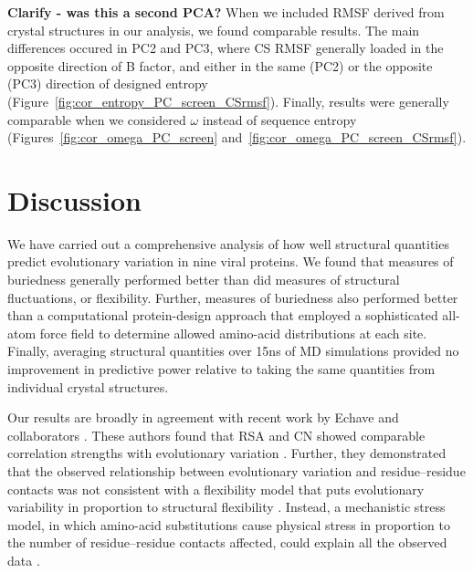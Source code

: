 \documentclass[smallextended]{svjour3}
\begin{document}
\textbf{Clarify - was this a second PCA?}
When we included RMSF derived from crystal structures in our analysis, we found comparable results. The main differences occured in PC2 and PC3, where CS RMSF generally loaded in the opposite direction of B factor, and either in the same (PC2) or the opposite (PC3) direction of designed entropy (Figure~\ref{fig:cor_entropy_PC_screen_CSrmsf}). Finally, results were generally comparable when we considered $\omega$ instead of sequence entropy (Figures~\ref{fig:cor_omega_PC_screen} and~\ref{fig:cor_omega_PC_screen_CSrmsf}).

\section*{Discussion}

We have carried out a comprehensive analysis of how well structural quantities predict evolutionary variation in nine viral proteins. We  found that measures of buriedness generally performed better than did measures of structural fluctuations, or flexibility. Further, measures of buriedness also performed better than a computational protein-design approach that employed a sophisticated all-atom force field to determine allowed amino-acid distributions at each site. Finally, averaging structural quantities over 15ns of MD simulations provided no improvement in predictive power relative to taking the same quantities from individual crystal structures. 

Our results are broadly in agreement with recent work by Echave and collaborators \citep{Yehetal2014,Huangetal2014}. These authors found that RSA and CN showed comparable correlation strengths with evolutionary variation \citep{Yehetal2014}. Further, they demonstrated that the observed relationship between evolutionary variation and residue--residue contacts was not consistent with a flexibility model that puts evolutionary variability in proportion to structural flexibility \citep{Huangetal2014}. Instead, a mechanistic stress model, in which amino-acid substitutions cause physical stress in proportion to the number of residue--residue contacts affected, could explain all the observed data \citep{Huangetal2014}.
\end{document}

